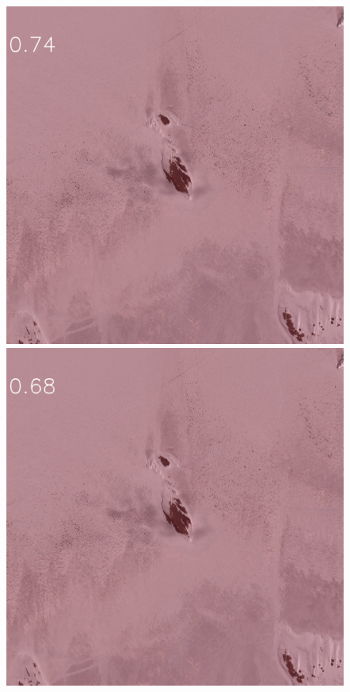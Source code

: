 \documentclass[runningheads]{llncs}
\begin{document}
\begin{figure}[h]
\includegraphics[width=\subFigx]{./fig/datagrow/MSE_single_unet_train_0_1.txt_bias-1_bs128_do0.1e25/WV02_20160101055824_103001004E1BFF00_16JAN01055824-M1BS-500637502050_01_P007_u08rf3031.png}
\includegraphics[width=\subFigx]{./fig/datagrow/MSE_single_unet_train_0_2.txt_bias-1_bs128_do0.1e25/WV02_20160101055824_103001004E1BFF00_16JAN01055824-M1BS-500637502050_01_P007_u08rf3031.png}

\end{figure}
\end{document}
